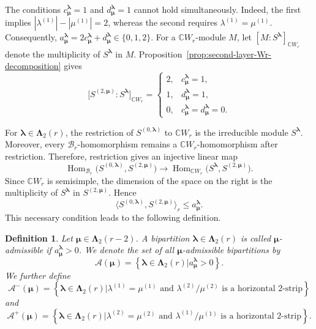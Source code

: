 \documentclass[10pt,a4paper]{amsart}
\newtheorem{definition}[theorem]{Definition}
\DeclareMathOperator {\Hom}{Hom}
\newcommand{\C}{\mathbb{C}}
\newcommand{\1}{\mathfrak{1}}
\newcommand{\B}{\mathcal{B}}
\begin{document}
The conditions $c_{\bm\mu}^{\bm\lambda}=1$ and
$d_{\bm\mu}^{\bm\lambda}=1$ cannot hold simultaneously.
Indeed, the first implies
$|\lambda^{(1)}|-|\mu^{(1)}|=2$, whereas the second
requires $\lambda^{(1)}=\mu^{(1)}$. Consequently,
$a_{\bm\mu}^{\bm\lambda}
=2c_{\bm\mu}^{\bm\lambda}+d_{\bm\mu}^{\bm\lambda}
\in\{0,1,2\}$. For a $\C W_r$-module $M$, let $[M:S^{\bm\lambda}]_{\C W_r}$ denote the multiplicity of $S^{\bm\lambda}$ in $M$. Proposition~\ref{prop:second-layer-Wr-decomposition}
gives
$$
\bigl[S^{(2,\bm\mu)}:S^{\bm\lambda}\bigr]_{\C W_r}=
\begin{cases}
2, & c_{\bm\mu}^{\bm\lambda}=1,\\
1, & d_{\bm\mu}^{\bm\lambda}=1,\\
0, & c_{\bm\mu}^{\bm\lambda}=d_{\bm\mu}^{\bm\lambda}=0.
\end{cases}
$$

For $\bm\lambda\in\bm\Lambda_2(r)$, the restriction of $S^{(0,\bm\lambda)}$ to $\C W_r$ is the irreducible module
$S^{\bm\lambda}$. Moreover, every $\B_r$-homomorphism remains a $\C W_r$-homomorphism after restriction. Therefore, restriction gives an
injective linear map
$$
\Hom_{\B_r}\bigl(S^{(0,\bm\lambda)},S^{(2,\bm\mu)}\bigr)\longrightarrow
\Hom_{\C W_r}\bigl(S^{\bm\lambda},S^{(2,\bm\mu)}\bigr).
$$
Since $\C W_r$ is semisimple, the dimension of the space on the right is the multiplicity of $S^{\bm\lambda}$ in $S^{(2,\bm\mu)}$. Hence
$$
\langle S^{(0,\bm\lambda)},S^{(2,\bm\mu)}
\rangle_r \leq a_{\bm\mu}^{\bm\lambda}.
$$
This necessary condition leads to the following definition.

\begin{definition}
\label{def:mu-admissible}
Let $\bm\mu\in\bm\Lambda_2(r-2)$. A bipartition $\bm\lambda\in\bm\Lambda_2(r)$ is called
\emph{$\bm\mu$-admissible} if $a_{\bm\mu}^{\bm\lambda}>0$. We denote the set of all $\bm\mu$-admissible bipartitions by
$$
\mathcal A(\bm\mu)=\left\{
\bm\lambda\in\bm\Lambda_2(r)\mathrel{\Big|}a_{\bm\mu}^{\bm\lambda}>0\right\}.
$$
We further define
$$
\mathcal A^-(\bm\mu)=\left\{
\bm\lambda\in\bm\Lambda_2(r)\mathrel{\Big|}\lambda^{(1)}=\mu^{(1)}\text{ and }
\lambda^{(2)}/\mu^{(2)}\text{ is a horizontal $2$-strip}\right\}
$$
and
$$
\mathcal A^+(\bm\mu)=\left\{
\bm\lambda\in\bm\Lambda_2(r)\mathrel{\Big|}\lambda^{(2)}=\mu^{(2)}\text{ and }
\lambda^{(1)}/\mu^{(1)}\text{ is a horizontal $2$-strip}\right\}.
$$
\end{definition}
\end{document}
